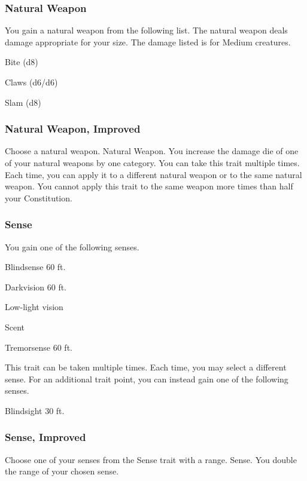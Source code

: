 \subsubsection{Natural Weapon}
\featben You gain a natural weapon from the following list. The natural weapon deals damage appropriate for your size. The damage listed is for Medium creatures.
\begin{itemize*}
    \item Bite (d8)
    \item Claws (d6/d6)
    \item Slam (d8)
\end{itemize*}

\subsubsection{Natural Weapon, Improved}
Choose a natural weapon.
\featpre Natural Weapon.
\featben You increase the damage die of one of your natural weapons by one category.
 You can take this trait multiple times. Each time, you can apply it to a different natural weapon or to the same natural weapon. You cannot apply this trait to the same weapon more times than half your Constitution. 

\subsubsection{Sense}
\featben You gain one of the following senses.
\begin{itemize*}
    \item Blindsense 60 ft.
    \item Darkvision 60 ft.
    \item Low-light vision
    \item Scent
    \item Tremorsense 60 ft.
\end{itemize*}

 This trait can be taken multiple times. Each time, you may select a different sense.
 For an additional trait point, you can instead gain one of the following senses.
\begin{itemize*}
    \item Blindsight 30 ft.
\end{itemize*}

\subsubsection{Sense, Improved}
Choose one of your senses from the Sense trait with a range.
\featpre Sense.
\featben You double the range of your chosen sense.

